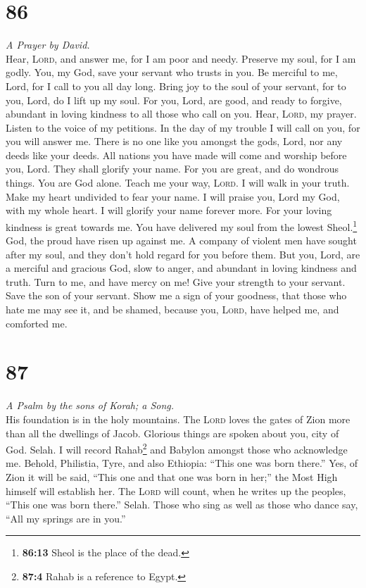 \hypertarget{section-85}{%
\section{86}\label{section-85}}

\emph{A Prayer by David.}\\
 Hear, \textsc{Lord}, and answer me, for I am poor and
needy.  Preserve my soul, for I am godly. You, my God,
save your servant who trusts in you.  Be merciful to me,
Lord, for I call to you all day long.  Bring joy to the
soul of your servant, for to you, Lord, do I lift up my soul.
 For you, Lord, are good, and ready to forgive, abundant
in loving kindness to all those who call on you.  Hear,
\textsc{Lord}, my prayer. Listen to the voice of my petitions.
 In the day of my trouble I will call on you, for you will
answer me.  There is no one like you amongst the gods,
Lord, nor any deeds like your deeds.  All nations you have
made will come and worship before you, Lord. They shall glorify your
name.  For you are great, and do wondrous things. You are
God alone.  Teach me your way, \textsc{Lord}. I will walk
in your truth. Make my heart undivided to fear your name.
 I will praise you, Lord my God, with my whole heart. I
will glorify your name forever more.  For your loving
kindness is great towards me. You have delivered my soul from the lowest
Sheol.\footnote{\textbf{86:13} Sheol is the place of the dead.}
 God, the proud have risen up against me. A company of
violent men have sought after my soul, and they don't hold regard for
you before them.  But you, Lord, are a merciful and
gracious God, slow to anger, and abundant in loving kindness and truth.
 Turn to me, and have mercy on me! Give your strength to
your servant. Save the son of your servant.  Show me a
sign of your goodness, that those who hate me may see it, and be shamed,
because you, \textsc{Lord}, have helped me, and comforted me.

\hypertarget{section-86}{%
\section{87}\label{section-86}}

\emph{A Psalm by the sons of Korah; a Song.}\\
 His foundation is in the holy mountains. 
The \textsc{Lord} loves the gates of Zion more than all the dwellings of
Jacob.  Glorious things are spoken about you, city of God.
Selah.  I will record Rahab\footnote{\textbf{87:4} Rahab
  is a reference to Egypt.} and Babylon amongst those who acknowledge
me. Behold, Philistia, Tyre, and also Ethiopia: ``This one was born
there.''  Yes, of Zion it will be said, ``This one and
that one was born in her;'' the Most High himself will establish her.
 The \textsc{Lord} will count, when he writes up the
peoples, ``This one was born there.'' Selah.  Those who
sing as well as those who dance say, ``All my springs are in you.''

